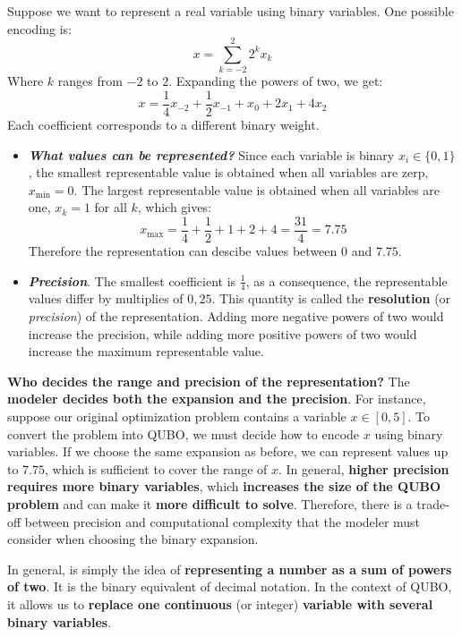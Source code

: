 \highspace
Suppose we want to represent a real variable using binary variables. One possible encoding is:
\begin{equation*}
    x = \sum_{k=-2}^{2} 2^{k} x_{k}
\end{equation*}
Where $k$ ranges from $-2$ to $2$. Expanding the powers of two, we get:
\begin{equation*}
    x = \frac{1}{4} x_{-2} + \frac{1}{2} x_{-1} + x_{0} + 2 x_{1} + 4 x_{2}
\end{equation*}
Each coefficient corresponds to a different binary weight.
\begin{itemize}
    \item \textbf{\emph{What values can be represented?}} Since each variable is binary $x_i \in \{0,1\}$, the smallest representable value is obtained when all variables are zerp, $x_{\min} = 0$. The largest representable value is obtained when all variables are one, $x_{k} = 1$ for all $k$, which gives:
    \begin{equation*}
        x_{\max} = \frac{1}{4} + \frac{1}{2} + 1 + 2 + 4 = \frac{31}{4} = 7.75
    \end{equation*}
    Therefore the representation can descibe values between $0$ and $7.75$.

    \item \textbf{\emph{Precision}}. The smallest coefficient is $\frac{1}{4}$, as a consequence, the representable values differ by multiplies of $0,25$. This quantity is called the \textbf{resolution} (or \emph{precision}) of the representation. Adding more negative powers of two would increase the precision, while adding more positive powers of two would increase the maximum representable value.
\end{itemize}
\textcolor{Green3}{ \textbf{Who decides the range and precision of the representation?}} The \textbf{modeler decides both the expansion and the precision}. For instance, suppose our original optimization problem contains a variable $x \in \left[0,5\right]$. To convert the problem into QUBO, we must decide how to encode $x$ using binary variables. If we choose the same expansion as before, we can represent values up to $7.75$, which is sufficient to cover the range of $x$. In general, \textbf{higher precision requires more binary variables}, which \textbf{increases the size of the QUBO problem} and can make it \textbf{more difficult to solve}. Therefore, there is a trade-off between precision and computational complexity that the modeler must consider when choosing the binary expansion.

\highspace
In general,  is simply the idea of \textbf{representing a number as a sum of powers of two}. It is the binary equivalent of decimal notation. In the context of QUBO, it allows us to \textbf{replace one continuous} (or integer) \textbf{variable with several binary variables}.